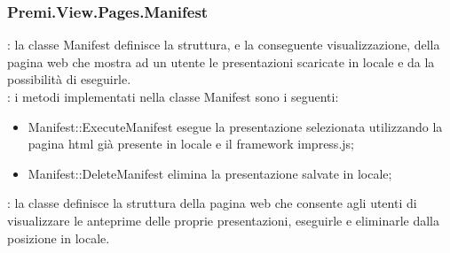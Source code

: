 {		\subsubsection{Premi.View.Pages.Manifest}{
			\textbf{\tipo}: la classe Manifest definisce la struttura, e la conseguente visualizzazione, della pagina web che mostra ad un utente le presentazioni scaricate in locale e da la possibilità di eseguirle.\\
			\textbf{\interfacce}: i metodi implementati nella classe Manifest sono i seguenti:
			\begin{itemize}
				\item Manifest::ExecuteManifest esegue la presentazione selezionata utilizzando la pagina html già presente in locale e il framework impress.js;
				\item Manifest::DeleteManifest elimina la presentazione salvate in locale;
			\end{itemize} 
			\textbf{\attivita}: la classe definisce la struttura della pagina web che consente agli utenti di visualizzare le anteprime delle proprie presentazioni, eseguirle e eliminarle dalla posizione in locale.\\\\
		}
}
